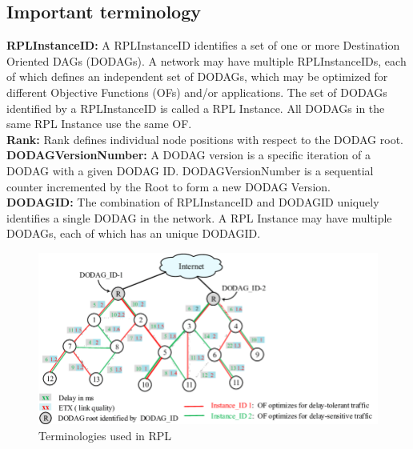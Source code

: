 \subsection{Important terminology} \label{Important Terminology}
\textbf{RPLInstanceID:}  A RPLInstanceID identifies a set of one or more Destination Oriented DAGs (DODAGs).  A network may have multiple RPLInstanceIDs, each of which defines an independent set of DODAGs, which may be optimized for different Objective Functions (OFs) and/or applications.  The set of DODAGs identified by a RPLInstanceID is called a RPL Instance.  All DODAGs in the same RPL Instance use the same OF.\\
\textbf{Rank:} Rank defines individual node positions with respect to the DODAG root.\\
\textbf{DODAGVersionNumber:} A DODAG version is a specific iteration of a DODAG with a given DODAG ID. DODAGVersionNumber is a sequential counter incremented by the Root to form a new DODAG Version.\\
\textbf{DODAGID:} The combination of RPLInstanceID and DODAGID uniquely identifies a single DODAG in the network.  A RPL Instance may have multiple DODAGs, each of which has an unique DODAGID.\\
\begin{figure}[H]
\centering
\includegraphics[width=150mm]{dag_structure.png}
\caption{Terminologies used in RPL}
\end{figure}

